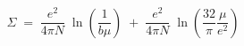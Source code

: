 \begin{equation}\label{eq:sigma1}
\Sigma \;=\; 
\frac{e^2}{4 \pi N} \; \ln(\frac{1}{b \mu}) \;+\;
\frac{e^2}{4 \pi N} \; \ln(\frac{32}{\pi} \frac{\mu}{e^2})
\end{equation}

